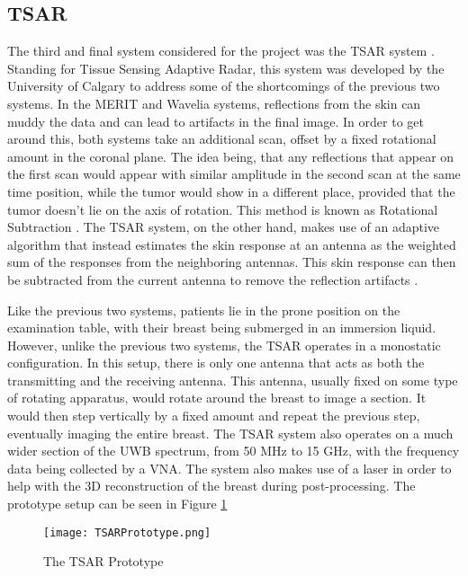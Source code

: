 \subsection{TSAR}
The third and final system considered for the project was the TSAR system \cite{e.c.fearMicrowaveBreastImaging2013}. Standing for Tissue Sensing Adaptive Radar,
this system was developed by the University of Calgary to address some of the shortcomings of the previous two systems.
In the MERIT and Wavelia systems, reflections from the skin can muddy the data and can lead to artifacts in the final
image. In order to get around this, both systems take an additional scan, offset by a fixed rotational amount in the
coronal plane. The idea being, that any reflections that appear on the first scan would appear with similar amplitude in
the second scan at the same time position, while the tumor would show in a different place, provided that the tumor
doesn't lie on the axis of rotation. This method is known as Rotational Subtraction
\cite{klemmImprovedDelayandSumBeamforming2008}. The TSAR system, on the other hand, makes use of an adaptive algorithm
that instead estimates the skin response at an antenna as the weighted sum of the responses from the neighboring
antennas. This skin response can then be subtracted from the current antenna to remove the reflection artifacts
\cite{makladNeighborhoodBasedAlgorithmFacilitate2012}. \hfill \break

Like the previous two systems, patients lie in the prone position on the examination table, with their breast being
submerged in an immersion liquid. However, unlike the previous two systems, the TSAR operates in a monostatic
configuration. In this setup, there is only one antenna that acts as both the transmitting and the receiving antenna.
This antenna, usually fixed on some type of rotating apparatus, would rotate around the breast to image a section. It
would then step vertically by a fixed amount and repeat the previous step, eventually imaging the entire breast. The
TSAR system also operates on a much wider section of the UWB spectrum, from 50 MHz to 15 GHz, with the frequency data
being collected by a VNA. The system also makes use of a laser in order to help with the 3D reconstruction of the breast
during post-processing. The prototype setup can be seen in Figure \ref{fig:TSARPrototype} \hfill \break

\begin{figure}
    \texttt{[image: TSARPrototype.png]}
    \centering
    \caption{The TSAR Prototype \cite{bourquiPrototypeSystemMeasuring2012}}
    \label{fig:TSARPrototype}
\end{figure}

